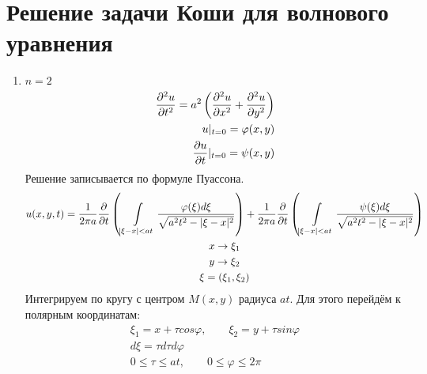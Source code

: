 \documentclass[../main.tex]{subfiles}
\begin{document}
\section{Решение задачи Коши для волнового уравнения}
\begin{enumerate}
    \item $n=2$
\begin{equation}
    \label{eq:2.7.1}
    \begin{split}
    \frac{\partial ^2u}{\partial t^2} = a^2\left(\frac{\partial ^2u}{\partial x^2}+\frac{\partial ^2u}{\partial y^2}\right)\\
    u|_{t=0} = \varphi(x,y)\\
    \frac{\partial u}{\partial t}|_{t=0} = \psi(x,y)
    \end{split}
\end{equation}
Решение записывается по формуле Пуассона.
\begin{gather*}
    u(x,y,t) = \frac{1}{2\pi a}\frac{\partial  }{\partial t}\left(
    \int\displaylimits_{|\xi-x|<at} \frac{\varphi(\xi)d\xi}{\sqrt{a^2t^2 - |\xi-x|^2}}\right)
    +
    \frac{1}{2\pi a}\frac{\partial  }{\partial t}\left(
    \int\displaylimits_{|\xi-x|<at} \frac{\psi(\xi)d\xi}{\sqrt{a^2t^2 - |\xi-x|^2}}\right)\\
    x \rightarrow \xi_1\\
    y \rightarrow \xi_2\\
    \xi = (\xi_1,\xi_2)
\end{gather*}
Интегрируем по кругу с центром $M(x,y)$ радиуса $at$. Для этого перейдём к
полярным координатам:
\begin{gather*}
    \xi_1 = x + \tau cos\varphi, \qquad \xi_2 = y + \tau sin\varphi\\
    d\xi = \tau d\tau d\varphi \\
    0 \leq \tau \leq at, \qquad 0 \leq \varphi \leq 2\pi
\end{gather*}


\end{enumerate}
\end{document}
